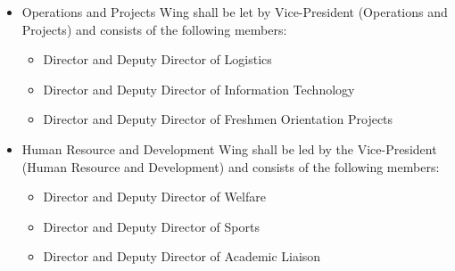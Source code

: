 \begin{itemize}
		\item Operations and Projects Wing shall be let by Vice-President (Operations and Projects) and consists of the following members:
		\begin{itemize}
		\item Director and Deputy Director of Logistics
		\item Director and Deputy Director of Information Technology
		\item Director and Deputy Director of Freshmen Orientation Projects
		\end{itemize}
		
		\item Human Resource and Development Wing shall be led by the Vice-President (Human Resource and Development) and consists of the following members:
		\begin{itemize}
		\item Director and Deputy Director of Welfare
		\item Director and Deputy Director of Sports
		\item Director and Deputy Director of Academic Liaison
		\end{itemize}
	\end{itemize}

